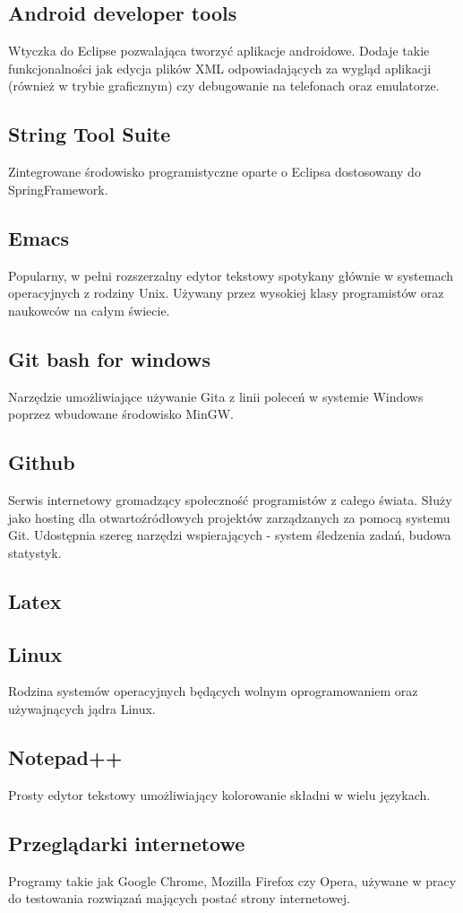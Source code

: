 \documentclass[11pt,a4paper,polish,thesis]{dcsbook}
\begin{document}
\subsection{Android developer tools}
Wtyczka do Eclipse pozwalająca tworzyć aplikacje androidowe. Dodaje takie funkcjonalności jak edycja plików XML odpowiadających za wygląd aplikacji (również w trybie graficznym) czy debugowanie na telefonach oraz emulatorze.
\subsection{String Tool Suite}
Zintegrowane środowisko programistyczne oparte o Eclipsa dostosowany do SpringFramework.
\subsection{Emacs}
Popularny, w pełni rozszerzalny edytor tekstowy spotykany głównie w systemach operacyjnych z rodziny Unix. Używany przez wysokiej klasy programistów oraz naukowców na całym świecie.
\subsection{Git bash for windows}
Narzędzie umożliwiające używanie Gita z linii poleceń w systemie Windows poprzez wbudowane środowisko MinGW.
\subsection{Github}
Serwis internetowy gromadzący społeczność programistów z całego świata. Służy jako hosting dla otwartoźródłowych projektów zarządzanych za pomocą systemu Git.
Udostępnia szereg narzędzi wspierających - system śledzenia zadań, budowa statystyk.
\subsection{Latex}

\subsection{Linux}
Rodzina systemów operacyjnych będących wolnym oprogramowaniem oraz używajnących jądra Linux.
\subsection{Notepad++}
Prosty edytor tekstowy umożliwiający kolorowanie składni w wielu językach.
\subsection{Przeglądarki internetowe}
Programy takie jak Google Chrome, Mozilla Firefox czy Opera, używane w pracy do testowania rozwiązań mających postać strony internetowej.
\end{document}
